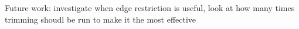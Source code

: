 \documentclass[../master/master.tex]{subfiles}
\begin{document}
Future work: investigate when edge restriction is useful, look at how many times trimming shoudl be run to make it the most effective
\end{document}
